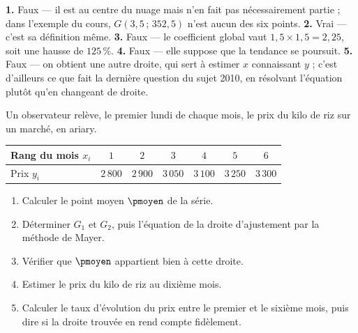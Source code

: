 \begin{corrige}
\textbf{1.} Faux — il est au centre du nuage mais n'en fait pas
nécessairement partie ; dans l'exemple du cours, $G(3{,}5\,;\,352{,}5)$
n'est aucun des six points.
\textbf{2.} Vrai — c'est sa définition même.
\textbf{3.} Faux — le coefficient global vaut $1{,}5\times1{,}5 = 2{,}25$,
soit une hausse de $125\,\%$.
\textbf{4.} Faux — elle suppose que la tendance se poursuit.
\textbf{5.} Faux — on obtient une autre droite, qui sert à estimer $x$
connaissant $y$ ; c'est d'ailleurs ce que fait la dernière question du
sujet 2010, en résolvant l'équation plutôt qu'en changeant de droite.
\end{corrige}

\begin{situation}
Un observateur relève, le premier lundi de chaque mois, le prix du kilo de
riz sur un marché, en ariary.

\begin{center}\footnotesize
\renewcommand{\arraystretch}{1.25}
\begin{tabular}{|l|c|c|c|c|c|c|}
\hline
Rang du mois $x_{i}$ & $1$ & $2$ & $3$ & $4$ & $5$ & $6$\\
\hline
Prix $y_{i}$ & $2\,800$ & $2\,900$ & $3\,050$ & $3\,100$ & $3\,250$ &
$3\,300$\\
\hline
\end{tabular}
\end{center}

\begin{enumerate}[label=\textbf{\arabic*.}, leftmargin=*, itemsep=0.3em]
  \item Calculer le point moyen $\pmoyen$ de la série.
  \item Déterminer $G_{1}$ et $G_{2}$, puis l'équation de la droite
        d'ajustement par la méthode de Mayer.
  \item Vérifier que $\pmoyen$ appartient bien à cette droite.
  \item Estimer le prix du kilo de riz au dixième mois.
  \item Calculer le taux d'évolution du prix entre le premier et le sixième
        mois, puis dire si la droite trouvée en rend compte fidèlement.
\end{enumerate}
\end{situation}

